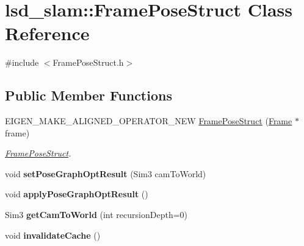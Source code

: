 \hypertarget{classlsd__slam_1_1_frame_pose_struct}{\section{lsd\-\_\-slam\-:\-:Frame\-Pose\-Struct Class Reference}
\label{classlsd__slam_1_1_frame_pose_struct}
}


{\ttfamily \#include $<$Frame\-Pose\-Struct.\-h$>$}

\subsection*{Public Member Functions}
\begin{DoxyCompactItemize}
\item 
E\-I\-G\-E\-N\-\_\-\-M\-A\-K\-E\-\_\-\-A\-L\-I\-G\-N\-E\-D\-\_\-\-O\-P\-E\-R\-A\-T\-O\-R\-\_\-\-N\-E\-W \hyperlink{classlsd__slam_1_1_frame_pose_struct_a73f4ca2938793d96b18822c8d5b995bd}{Frame\-Pose\-Struct} (\hyperlink{classlsd__slam_1_1_frame}{Frame} $\ast$frame)
\begin{DoxyCompactList}\small\item\em \hyperlink{classlsd__slam_1_1_frame_pose_struct}{Frame\-Pose\-Struct}. \end{DoxyCompactList}\item 
\hypertarget{classlsd__slam_1_1_frame_pose_struct_a3d5c5bd4bf131a4ccbda54b9554d18f9}{void {\bfseries set\-Pose\-Graph\-Opt\-Result} (Sim3 cam\-To\-World)}\label{classlsd__slam_1_1_frame_pose_struct_a3d5c5bd4bf131a4ccbda54b9554d18f9}

\item 
\hypertarget{classlsd__slam_1_1_frame_pose_struct_a6a5df905cf934f3a20f4ff2a21060aab}{void {\bfseries apply\-Pose\-Graph\-Opt\-Result} ()}\label{classlsd__slam_1_1_frame_pose_struct_a6a5df905cf934f3a20f4ff2a21060aab}

\item 
\hypertarget{classlsd__slam_1_1_frame_pose_struct_ae2e711db13b9732374fd5e04f960f914}{Sim3 {\bfseries get\-Cam\-To\-World} (int recursion\-Depth=0)}\label{classlsd__slam_1_1_frame_pose_struct_ae2e711db13b9732374fd5e04f960f914}

\item 
\hypertarget{classlsd__slam_1_1_frame_pose_struct_ab9486b6fbedeb81e5e7d29f02f92c008}{void {\bfseries invalidate\-Cache} ()}\label{classlsd__slam_1_1_frame_pose_struct_ab9486b6fbedeb81e5e7d29f02f92c008}

\end{DoxyCompactItemize}
